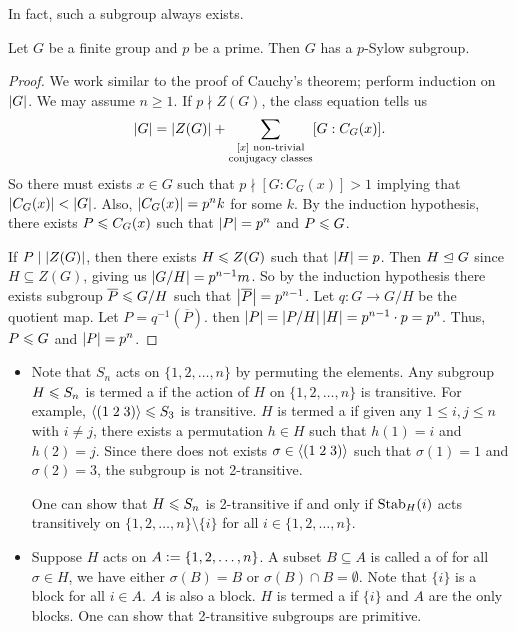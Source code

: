 In fact, such a subgroup always exists.

\begin{theorem}
    Let $G$ be a finite group and $p$ be a prime. Then $G$ has a $p$-Sylow subgroup.
\end{theorem}

\begin{proof}
    We work similar to the proof of Cauchy's theorem; perform induction on $\left| G \right|$. We may assume $n \geq 1$. If $p \nmid Z(G)$, the class equation tells us 
    \begin{align}
        \left| G \right| = \left| Z(G) \right| + \sum_{\substack{[x] \text{ non-trivial}\\ \text{conjugacy classes}}} [G:C_G(x)].
    \end{align}
    So there must exists $x \in G$ such that $p \nmid [G:C_G(x)] > 1$ implying that $\left| C_{G}(x) \right| < \left| G \right|$. Also, $\left| C_{G}(x) \right| = p^{n}k$ for some $k$. By the induction hypothesis, there exists $P \leqslant C_{G}(x)$ such that $\left| P \right| = p^{n}$ and $P \leqslant G$.

    If $P \mid \left| Z(G) \right|$, then there exists $H \leqslant Z(G)$ such that $\left| H \right| = p$. Then $H \trianglelefteq G$ since $H \subseteq Z(G)$, giving us $\left| G/H \right| = p^{n-1}m$. So by the induction hypothesis there exists subgroup $\overline{P} \leqslant G/H$ such that $\left| \overline{P} \right| = p^{n-1}$. Let $q:G \to G/H$ be the quotient map. Let $P = q^{-1}(\overline{P})$. then $\left| P \right| = \left| P/H \right|\left| H \right| = p^{n-1} \cdot p = p^{n}$. Thus, $P \leqslant G$ and $\left| P \right| = p^{n}$.
\end{proof}


\begin{remark}
    \begin{itemize}
        \item Note that $S_{n}$ acts on $\{1,2,\ldots,n\}$ by permuting the elements. Any subgroup $H \leqslant S_{n}$ is termed a  if the action of $H$ on $\{1,2,\ldots,n\}$ is transitive. For example, $\langle(1\;2\;3)\rangle \leqslant S_{3}$ is transitive. $H$ is termed a  if given any $1 \leq i,j \leq n$ with $i \neq j$, there exists a permutation $h \in H$ such that $h(1) = i$ and $h(2) = j$. Since there does not exists $\sigma \in \langle(1\;2\;3)\rangle$ such that $\sigma(1) = 1$ and $\sigma(2) = 3$, the subgroup is not 2-transitive.

        One can show that $H \leqslant S_{n}$ is 2-transitive if and only if $\operatorname{Stab}_{H}(i)$ acts transitively on $\{1,2,\ldots,n\} \setminus \{i\}$ for all $i \in \{1,2,\ldots,n\}$.


        \item Suppose $H$ acts on $A \vcentcolon= \{1,2,\ldots,n\}$. A subset $B \subseteq A$ is called a  of for all $\sigma \in H$, we have either $\sigma(B) = B$ or $\sigma(B) \cap B = \emptyset$. Note that $\{i\}$ is a block for all $i \in A$. $A$ is also a block. $H$ is termed a  if $\{i\}$ and $A$ are the only blocks. One can show that 2-transitive subgroups are primitive.
    \end{itemize}
\end{remark}

